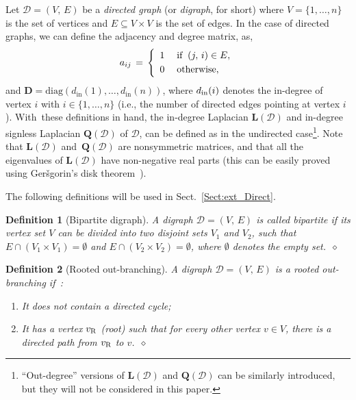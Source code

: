 \documentclass[letterpaper,9pt,twocolumn]{autart}
\newcommand{\vet}[1]{\ensuremath{{\mathbf #1}}}
\newtheorem{definition}{\textbf{Definition}}
\begin{document}
Let $\mathcal{D} = (V,\,E)$ be a \emph{directed graph} (or \emph{digraph}, for short) where
$V = \{1,\ldots,n\}$ is the set of vertices and $E \subseteq V \!\times V$
is the set of edges. In the case of directed graphs, we can define the adjacency
and degree matrix, as,
\begin{equation*}\label{Eq:Ad_mat_gen_dir}
a_{ij} \,=\, \left\{
\begin{array}{ll}
1\; & \text{if}\;\; (j,\,i) \in E,\vspace{0.1cm}\\
0\; & \text{otherwise},
\end{array}
\right.
\end{equation*}
and $\vet{D} = \text{diag}(d_{\text{in}}(1),\ldots,d_{\text{in}}(n))$,
where $d_{\textup{in}}(i)$ denotes the in-degree of vertex $i$ with $i
\in \{1,\ldots,n\}$ (i.e., the number
of directed edges pointing at vertex $i$). With~these definitions in
hand, the in-degree Laplacian $\vet{L}(\mathcal{D})$ and 
in-degree signless Laplacian $\vet{Q}(\mathcal{D})$ of $\mathcal{D}$, can be defined as
in the undirected case\footnote{``Out-degree'' versions of
$\vet{L}(\mathcal{D})$ and $\vet{Q}(\mathcal{D})$ can be similarly
introduced, but they will not be considered in this paper.}. Note that 
$\vet{L}(\mathcal{D})$ and~$\vet{Q}(\mathcal{D})$ are nonsymmetric
matrices, and that all the eigenvalues of $\vet{L}(\mathcal{D})$ have
non-negative real parts (this can be easily proved using
Ger\v{s}gorin's disk theorem~\cite{OlfatiFaMu_IEEE07}). 

The following definitions will be used in
Sect.~\ref{Sect:ext_Direct}. 

\begin{definition}[Bipartite digraph]
A digraph $\mathcal{D} = (V,\,E)$ is called bipartite if its vertex set $V$ can be divided into
two disjoint sets $V_1$ and $V_2$, such that $E \cap (V_1 \times V_1) = \emptyset$ and
$E \cap (V_2 \times V_2) = \emptyset$, where $\emptyset$ denotes the
empty set.~\hfill$\diamond$
\end{definition}
\begin{definition}[Rooted out-branching]
A digraph $\mathcal{D} = (V,\,E)$ is a rooted out-branching if~\cite{MesbahiEg_book10}:
\begin{enumerate}
\item It does not contain a directed cycle;
\item It has a vertex $v_{\textup{R}}$ (root) such that for every
other vertex $v \in V$, there is a directed path from $v_{\textup{R}}$ to $v$.~\hfill$\diamond$
\end{enumerate}
\end{definition}
\end{document}
